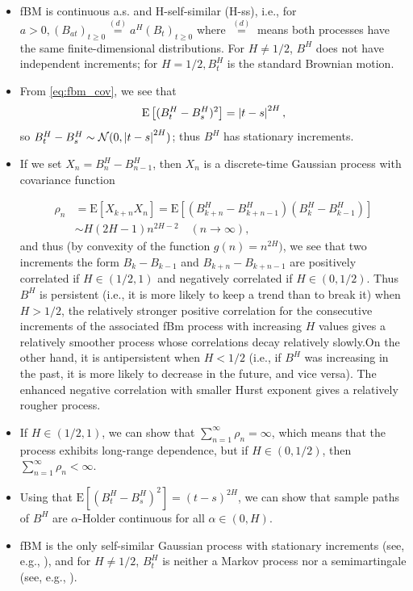 \documentclass[11pt]{article}
\newcommand{\expt}[1]{\mathrm{E}\left[#1\right]}
\begin{document}
\begin{itemize}
	\item fBM is continuous a.s. and H-self-similar (H-ss), i.e., for $a>0, (B_{at})_{t \ge 0}  \overset{(d)}{=} a^H (B_t)_{t \ge 0}$ where $ \overset{(d)}{=}$ means both processes have the same finite-dimensional distributions. For $H \neq 1/2$, $B^H$ does not have independent increments; for $H=1/2, B^H_t$ is the standard Brownian motion. 
	\item From \eqref{eq:fbm_cov}, we see that 
	\begin{equation*}
	\expt{(B_t^H-B_s^H)^2}=\abs{t-s}^{2H},
	\end{equation*}
so $B_t^H-B_s^H \sim \mathcal{N}(0,\left\lvert t-s\right\rvert^{2H})$; thus $B^H$ has stationary increments.
\item If we set $X_n=B^H_n-B^H_{n-1}$, then $X_n$ is a  discrete-time Gaussian process with covariance function

\begin{align*}
\rho_n&=\expt{X_{k+n} X_n}=\expt{\left(B_{k+n}^H -B^H_{k+n-1}\right)\left(B_{k}^H -B^H_{k-1}\right)}\\
&\sim H (2H-1) n^{2H-2}\quad (n \rightarrow \infty),
\end{align*}
and thus (by convexity of the function $g(n) = n^{2H})$, we see that two increments the form $B_k-B_{k-1}$ and $B_{k+n}-B_{k+n-1}$ are positively correlated if $H  \in (1/2,1)$ and negatively correlated if $H \in (0,1/2)$. Thus $B^H$ is persistent (i.e., it is more likely to keep a trend than to break it) when $H>1/2$, the relatively stronger positive correlation for the consecutive increments of the associated fBm process with increasing $H$ values gives a relatively smoother process whose correlations decay relatively slowly.On the other hand, it is antipersistent when $H<1/2$ (i.e., if $B^H$ was increasing in the past, it is more likely to decrease in the future, and vice versa). The enhanced negative correlation with smaller Hurst exponent gives a relatively rougher process.

\item If $H \in (1/2,1)$, we can show that $\sum_{n=1}^\infty \rho_n= \infty$, which means that the process exhibits long-range dependence, but if $H \in(0, 1/2)$, then  $\sum_{n=1}^\infty \rho_n< \infty$.

\item Using that $\expt{(B^H_t- B^H_s)^2} = (t-s)^{2H}$, we can show that sample paths of $B^H$ are $\alpha$-H\:older continuous for all $\alpha \in (0,H)$.
\item fBM is the only self-similar Gaussian process with stationary increments (see, e.g., \cite{marquardt2006fractional}), and for $H\neq 1/2$, $B^H_t$ is neither a Markov process nor a semimartingale (see, e.g., \cite{nualart2006malliavin}).
\end{itemize}
\end{document}

